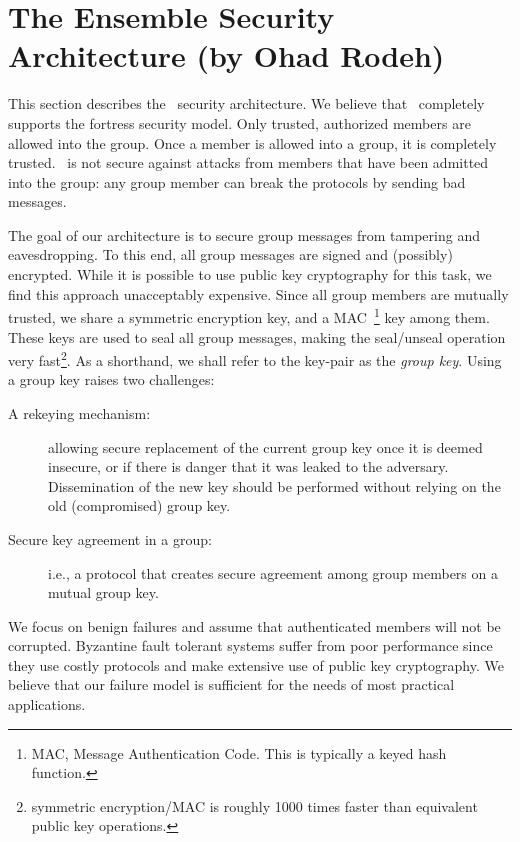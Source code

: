\section{The Ensemble Security Architecture (by Ohad Rodeh)}

This section describes the \ensemble\ security architecture. We
believe that \ensemble\ completely supports the fortress security
model. Only trusted, authorized members are allowed into the group.
Once a member is allowed into a group, it is completely trusted.
\ensemble\ is not secure against attacks from members that have been
admitted into the group: any group member can break the protocols by
sending bad messages.

The goal of our architecture is to secure group messages from
tampering and eavesdropping. To this end, all group messages are
signed and (possibly) encrypted. While it is possible to use public
key cryptography for this task, we find this approach unacceptably
expensive. Since all group members are mutually trusted, we share a
symmetric encryption key, and a MAC~\footnote{MAC, Message Authentication
Code. This is typically a keyed hash function.} key among them. These
keys are used to seal all group messages, making the seal/unseal
operation very fast\footnote{symmetric encryption/MAC is roughly 1000
times faster than equivalent public key operations.}. As a shorthand,
we shall refer to the key-pair as the {\it group key}. Using a group key
raises two challenges:

\begin{description}
\item[ A rekeying mechanism:] allowing secure replacement of the current
group key once it is deemed insecure, or if there is danger that it
was leaked to the adversary. Dissemination of the new key should be
performed without relying on the old (compromised) group key.

\item[Secure key agreement in a group:] i.e., a protocol that creates
secure agreement among group members on a mutual group key. 
\end{description}

We focus on benign failures and assume that authenticated members will
not be corrupted.  Byzantine fault tolerant systems suffer from
poor performance since they use costly protocols and make extensive use of
public key cryptography. We believe that our failure model is
sufficient for the needs of most practical applications.  

